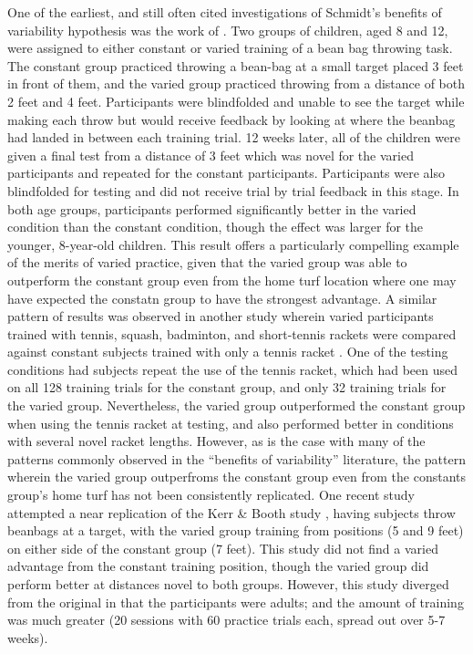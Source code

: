 \documentclass[
  12pt,
  letterpaper,
]{article}
\begin{document}
One of the earliest, and still often cited investigations of Schmidt's
benefits of variability hypothesis was the work of
\textcite{kerrSpecificVariedPractice1978}. Two groups of children, aged
8 and 12, were assigned to either constant or varied training of a bean
bag throwing task. The constant group practiced throwing a bean-bag at a
small target placed 3 feet in front of them, and the varied group
practiced throwing from a distance of both 2 feet and 4 feet.
Participants were blindfolded and unable to see the target while making
each throw but would receive feedback by looking at where the beanbag
had landed in between each training trial. 12 weeks later, all of the
children were given a final test from a distance of 3 feet which was
novel for the varied participants and repeated for the constant
participants. Participants were also blindfolded for testing and did not
receive trial by trial feedback in this stage. In both age groups,
participants performed significantly better in the varied condition than
the constant condition, though the effect was larger for the younger,
8-year-old children. This result offers a particularly compelling
example of the merits of varied practice, given that the varied group
was able to outperform the constant group even from the home turf
location where one may have expected the constatn group to have the
strongest advantage. A similar pattern of results was observed in
another study wherein varied participants trained with tennis, squash,
badminton, and short-tennis rackets were compared against constant
subjects trained with only a tennis racket
\autocite{greenPracticeVariabilityTransfer1995a}. One of the testing
conditions had subjects repeat the use of the tennis racket, which had
been used on all 128 training trials for the constant group, and only 32
training trials for the varied group. Nevertheless, the varied group
outperformed the constant group when using the tennis racket at testing,
and also performed better in conditions with several novel racket
lengths. However, as is the case with many of the patterns commonly
observed in the ``benefits of variability'' literature, the pattern
wherein the varied group outperfroms the constant group even from the
constants group's home turf has not been consistently replicated. One
recent study attempted a near replication of the Kerr \& Booth study
\autocite{willeyLongtermMotorLearning2018}, having subjects throw
beanbags at a target, with the varied group training from positions (5
and 9 feet) on either side of the constant group (7 feet). This study
did not find a varied advantage from the constant training position,
though the varied group did perform better at distances novel to both
groups. However, this study diverged from the original in that the
participants were adults; and the amount of training was much greater
(20 sessions with 60 practice trials each, spread out over 5-7 weeks).
\end{document}
